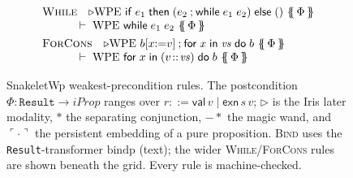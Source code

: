 \documentclass[sigconf,nonacm]{acmart}
\newcommand{\sepc}{\mathbin{\ast}}
\newcommand{\wand}{\mathrel{-\!\ast}}
\newcommand{\pure}[1]{\ulcorner #1 \urcorner}
\newcommand{\code}[1]{\texttt{#1}}
\newcommand{\later}{{\triangleright}}
\newcommand{\wpe}[2]{\mathrm{WPE}\ #1\ \{\!\!\{\, #2 \,\}\!\!\}}
\newcommand{\rval}[1]{\mathsf{val}\,#1}
\newcommand{\rexn}[2]{\mathsf{exn}\,#1\,#2}
\newcommand{\subs}[3]{#1[#2{:=}#3]}
\begin{document}
\begin{figure}[t]
\[\begin{array}{l}
\textsc{While}\quad \later \wpe{\mathsf{if}\;e_1\;\mathsf{then}\;(e_2 \mathbin{;} \mathsf{while}\;e_1\;e_2)\;\mathsf{else}\;()}{\Phi} \\
\qquad\quad {}\vdash\; \wpe{\mathsf{while}\;e_1\;e_2}{\Phi} \\[4pt]
\textsc{ForCons}\quad \later \wpe{\subs{b}{x}{v} \mathbin{;} \mathsf{for}\;x\;\mathsf{in}\;\mathit{vs}\;\mathsf{do}\;b}{\Phi} \\
\qquad\quad {}\vdash\; \wpe{\mathsf{for}\;x\;\mathsf{in}\;(v\!::\!\mathit{vs})\;\mathsf{do}\;b}{\Phi}
\end{array}
\]
\caption{SnakeletWp weakest-precondition rules. The postcondition $\Phi :
\code{Result} \to \mathit{iProp}$ ranges over $r ::= \rval{v} \mid \rexn{s}{v}$;
$\later$ is the Iris later modality, $\sepc$ the separating conjunction, $\wand$
the magic wand, and $\pure{\cdot}$ the persistent embedding of a pure proposition.
\textsc{Bind} uses the \code{Result}-transformer $\mathrm{bindp}$ (text); the
wider \textsc{While}/\textsc{ForCons} rules are shown beneath the grid. Every
rule is machine-checked.}
\label{fig:wp}
\end{figure}
\end{document}
